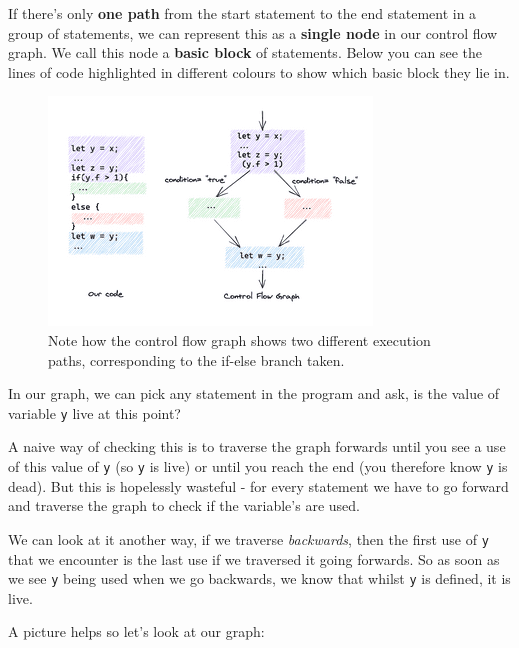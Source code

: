 If there's only \textbf{one path} from the start statement to the end
statement in a group of statements, we can represent this as a
\textbf{single node} in our control flow graph. We call this node a
\textbf{basic block} of statements. Below you can see the lines of code
highlighted in different colours to show which basic block they lie in.

\begin{figure}
\centering
\includegraphics[width=\linewidth]{05_files/control-flow-graph.png}
\caption{Note how the control flow graph shows two different execution
paths, corresponding to the if-else branch taken.}
\end{figure}

In our graph, we can pick any statement in the program and ask, is the
value of variable \texttt{y} live at this point?

A naive way of checking this is to traverse the graph forwards until you
see a use of this value of \texttt{y} (so \texttt{y} is live) or until
you reach the end (you therefore know \texttt{y} is dead). But this is
hopelessly wasteful - for every statement we have to go forward and
traverse the graph to check if the variable's are used.

We can look at it another way, if we traverse \emph{backwards}, then the
first use of \texttt{y} that we encounter is the last use if we
traversed it going forwards. So as soon as we see \texttt{y} being used
when we go backwards, we know that whilst \texttt{y} is defined, it is
live.

A picture helps so let's look at our graph:

